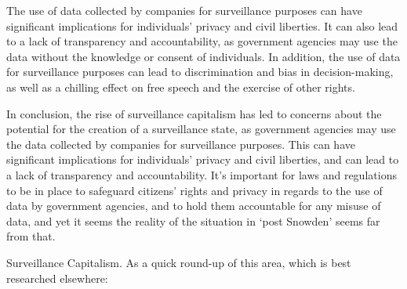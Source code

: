 The use of data collected by companies for surveillance purposes can have significant implications for individuals' privacy and civil liberties. It can also lead to a lack of transparency and accountability, as government agencies may use the data without the knowledge or consent of individuals. In addition, the use of data for surveillance purposes can lead to discrimination and bias in decision-making, as well as a chilling effect on free speech and the exercise of other rights.\par
In conclusion, the rise of surveillance capitalism has led to concerns about the potential for the creation of a surveillance state, as government agencies may use the data collected by companies for surveillance purposes. This can have significant implications for individuals' privacy and civil liberties, and can lead to a lack of transparency and accountability. It's important for laws and regulations to be in place to safeguard citizens' rights and privacy in regards to the use of data by government agencies, and to hold them accountable for any misuse of data, and yet it seems the reality of the situation in `post Snowden' seems far from that.\par 
Surveillance Capitalism. As a quick round-up of this area, which is best researched elsewhere:

